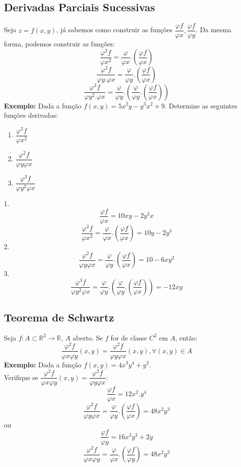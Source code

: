 \documentclass{article}
\begin{document}
	\subsection{Derivadas Parciais Sucessivas}
		Seja $z=f(x,y)$, já sabemos como construir as funções $\dfrac{\varphi f}{\varphi x}, \dfrac{\varphi f}{\varphi y}$. Da mesma forma, podemos construir as funções:
		$$\dfrac{\varphi ^2 f}{\varphi x^2} = \dfrac{\varphi}{\varphi x}.(\dfrac{\varphi f}{\varphi x})$$
		$$\dfrac{\varphi^2f}{\varphi y . \varphi x}= \dfrac{\varphi}{\varphi y}.(\dfrac{\varphi f}{\varphi x})$$
		$$\dfrac{\varphi ^3f}{\varphi y^2.\varphi x} = \dfrac{\varphi}{\varphi y}.(\dfrac{\varphi}{\varphi y}.(\dfrac{\varphi f}{\varphi x}))$$
		\textbf{Exemplo:} Dada a função $f(x,y) = 5x^2y-y^3x^2+9$. Determine as seguintes funções derivadas:
		\begin{enumerate}
			\item $\dfrac{\varphi^2f}{\varphi x^2}$
			\item $\dfrac{\varphi ^2 f}{\varphi y \varphi x}$
			\item $\dfrac{\varphi ^3f}{\varphi y^2\varphi x}$
		\end{enumerate}
		1.
		$$\dfrac{\varphi f}{\varphi x} = 10xy-2y^3x$$
		$$\dfrac{\varphi ^2f}{\varphi x^2} = \dfrac{\varphi}{\varphi x}.(\dfrac{\varphi f}{\varphi x}) = 10y - 2y^3$$
		2.
		$$\dfrac{\varphi ^2f}{\varphi y \varphi x}=\dfrac{\varphi}{\varphi y}.(\dfrac{\varphi f}{\varphi x})=10-6xy^2$$
		3.
		$$\dfrac{\varphi ^3 f}{\varphi y^2 \varphi x}=\dfrac{\varphi}{\varphi y}.(\dfrac{\varphi}{\varphi y}.(\dfrac{\varphi f}{\varphi x})) = -12xy$$
		
		
	\subsection{Teorema de Schwartz}
		Seja $f:A \subset \mathbb{R}^2\to \mathbb{R}$, $A$ aberto. Se $f$ for de classe $C^2$ em $A$, então:
		$$\dfrac{\varphi ^2 f}{\varphi x \varphi y}(x,y) = \dfrac{\varphi ^2 f}{\varphi y \varphi x}(x,y), \forall (x,y) \in A$$
		\textbf{Exemplo:} Dada a função $f(x,y)= 4x^3y^4+y^2$.\\
		Verifique se $\dfrac{\varphi ^2 f}{\varphi x \varphi y}(x,y) = \dfrac{\varphi ^2 f}{\varphi y \varphi x}$:
		$$\dfrac{\varphi f}{\varphi x} = 12x^2.y^4$$
		$$\dfrac{\varphi ^2 f}{\varphi y \varphi x} =\dfrac{\varphi}{\varphi y} .(\dfrac{\varphi f}{\varphi x}) = 48 x^2y^3$$
		ou
		$$\dfrac{\varphi f}{\varphi y} = 16 x^3y^3+2y$$
		$$\dfrac{\varphi ^2 f}{\varphi x \varphi y} = \dfrac{\varphi}{\varphi x}.(\dfrac{\varphi f}{\varphi y}) = 48x^2y^3$$
\end{document}
